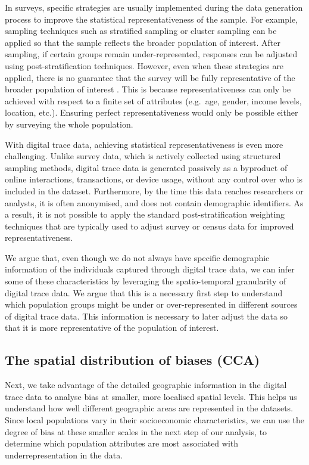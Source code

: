 \documentclass[]{rsos}%
\begin{document}
In surveys, specific strategies are usually implemented during the data
generation process to improve the statistical representativeness of the
sample. For example, sampling techniques such as stratified sampling or
cluster sampling can be applied so that the sample reflects the broader
population of interest. After sampling, if certain groups remain
under-represented, responses can be adjusted using post-stratification
techniques. However, even when these strategies are applied, there is no
guarantee that the survey will be fully representative of the broader
population of interest \citep{cochran1977sampling}. This is because
representativeness can only be achieved with respect to a finite set of
attributes (e.g.~age, gender, income levels, location, etc.). Ensuring
perfect representativeness would only be possible either by surveying
the whole population.

With digital trace data, achieving statistical representativeness is
even more challenging. Unlike survey data, which is actively collected
using structured sampling methods, digital trace data is generated
passively as a byproduct of online interactions, transactions, or device
usage, without any control over who is included in the dataset.
Furthermore, by the time this data reaches researchers or analysts, it
is often anonymised, and does not contain demographic identifiers. As a
result, it is not possible to apply the standard post-stratification
weighting techniques that are typically used to adjust survey or census
data for improved representativeness.

We argue that, even though we do not always have specific demographic
information of the individuals captured through digital trace data, we
can infer some of these characteristics by leveraging the
spatio-temporal granularity of digital trace data. We argue that this is
a necessary first step to understand which population groups might be
under or over-represented in different sources of digital trace data.
This information is necessary to later adjust the data so that it is
more representative of the population of interest.

\hypertarget{the-spatial-distribution-of-biases-cca}{%
\subsection{The spatial distribution of biases (CCA)}\label{the-spatial-distribution-of-biases-cca}}

Next, we take advantage of the detailed geographic information in the
digital trace data to analyse bias at smaller, more localised spatial
levels. This helps us understand how well different geographic areas are
represented in the datasets. Since local populations vary in their
socioeconomic characteristics, we can use the degree of bias at these
smaller scales in the next step of our analysis, to determine which
population attributes are most associated with underrepresentation in
the data.
\end{document}
